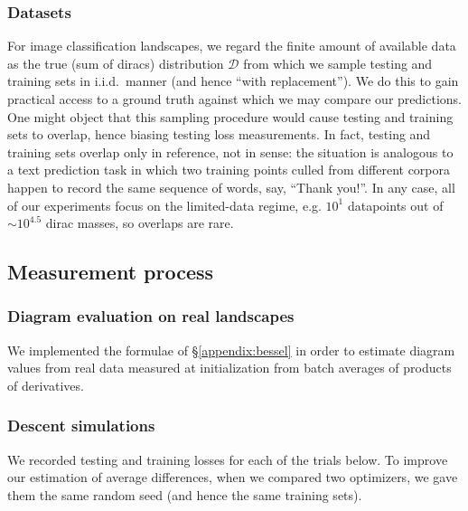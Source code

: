\documentclass[anon,12pt]{colt2021} %
\newcommand{\Dd}{\mathcal{D}}
\begin{document}
{            \subsubsection{Datasets}
                For image classification landscapes, we regard the finite amount of
                available data as the true (sum of diracs) distribution $\Dd$ from
                which we sample testing and training sets in i.i.d.\ manner (and hence
                ``with replacement'').  We do this to gain practical access to a
                ground truth against which we may compare our predictions.  One
                might object that this sampling procedure would cause testing and
                training sets to overlap, hence biasing testing loss measurements.  In
                fact, testing and training sets overlap only in reference, not in
                sense: the situation is analogous to a text prediction task in
                which two training points culled from different corpora happen to
                record the same sequence of words, say, ``Thank you!''.  In any
                case, all of our experiments focus on the limited-data regime, e.g.
                $10^1$ datapoints out of $\sim 10^{4.5}$ dirac masses, so overlaps
                are rare.

        \subsection{Measurement process}                                \label{appendix:measure}

            \subsubsection{Diagram evaluation on real landscapes}
                We implemented the formulae of \S\ref{appendix:bessel} in order
                to estimate diagram values from real data measured at
                initialization from batch averages of products of derivatives.

            \subsubsection{Descent simulations}
                We recorded testing and training losses for each of the trials below.  To
                improve our estimation of average differences, when we compared two
                optimizers, we gave them the same random seed (and hence the same
                training sets).

}
\end{document}
